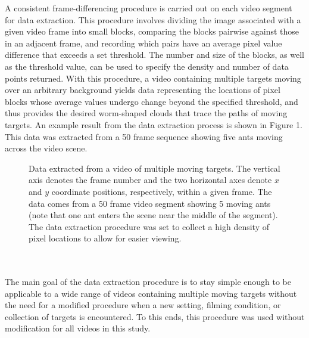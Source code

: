 \documentclass{article}
\begin{document}
A consistent frame-differencing procedure is carried out on each video segment for data extraction. This procedure involves dividing the image associated with a given video frame into small blocks, comparing the blocks pairwise against those in an adjacent frame, and recording which pairs have an average pixel value difference that exceeds a set threshold. The number and size of the blocks, as well as the threshold value, can be used to specify the density and number of data points returned. With this procedure, a video containing multiple targets moving over an arbitrary background yields data representing the locations of pixel blocks whose average values undergo change beyond the specified threshold, and thus provides the desired worm-shaped clouds that trace the paths of moving targets. An example result from the data extraction process is shown in Figure 1. This data was extracted from a 50 frame sequence showing five ants moving across the video scene.\\
\begin{figure}[htb]
        \caption{\label{Figure 1:} Data extracted from a video of multiple moving targets. The vertical axis denotes the frame number and the two horizontal axes denote $x$ and $y$ coordinate positions, respectively, within a given frame. The data comes from a 50 frame video segment showing 5 moving ants (note that one ant enters the scene near the middle of the segment). The data extraction procedure was set to collect a high density of pixel locations to allow for easier viewing.}
\end{figure}\\
\\
The main goal of the data extraction procedure is to stay simple enough to be applicable to a wide range of videos containing multiple moving targets without the need for a modified procedure when a new setting, filming condition, or collection of targets is encountered. To this ends, this procedure was used without modification for all videos in this study.
\end{document}
